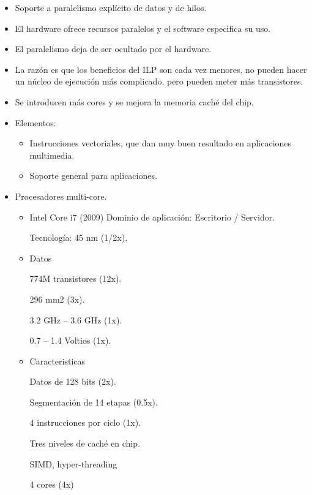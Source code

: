 \documentclass[12pt, twoside, openright]{report} %
\begin{document}
    \begin{itemize}
    \item
      Soporte a paralelismo explícito de datos y de hilos.
    \item
      El hardware ofrece recursos paralelos y el software especifica su
      uso.
    \item
      El paralelismo deja de ser ocultado por el hardware.
    \item
      La razón es que los beneficios del ILP son cada vez menores, no
      pueden hacer un núcleo de ejecución más complicado, pero pueden
      meter más transistores.
    \item
      Se introducen más cores y se mejora la memoria caché del chip.
    \item
      Elementos:

      \begin{itemize}
      
      \item
        Instrucciones vectoriales, que dan muy buen resultado en
        aplicaciones multimedia.
      \item
        Soporte general para aplicaciones.
      \end{itemize}

      \item Procesadores multi-core.
      \begin{itemize}
        \item Intel Core i7 (2009)
          Dominio de aplicación: Escritorio / Servidor.

          Tecnología: 45 nm (1/2x).

        \item Datos

          774M transistores (12x).

          296 mm2 (3x).

          3.2 GHz – 3.6 GHz (1x).

          0.7 – 1.4 Voltios (1x).

        \item Caracteristicas

          Datos de 128 bits (2x).

          Segmentación de 14 etapas (0.5x).

          4 instrucciones por ciclo (1x).

          Tres niveles de caché en chip.

          SIMD, hyper-threading

          4 cores (4x)
      \end{itemize}
    \end{itemize}
\vspace{-.5cm}
\end{document}
